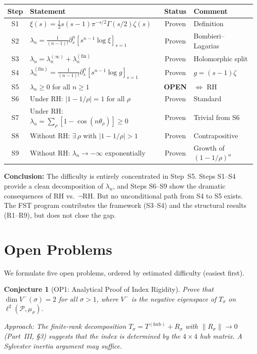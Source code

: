\documentclass[12pt,a4paper]{article}
\newtheorem{conjecture}[theorem]{Conjecture}
\theoremstyle{definition}
\theoremstyle{remark}
\newcommand{\muG}{\mu_\sigma}
\newcommand{\PP}{\mathcal{P}}
\begin{document}
\medskip
\begin{center}
\renewcommand{\arraystretch}{1.3}
\begin{tabular}{c|l|c|l}
\textbf{Step} & \textbf{Statement} & \textbf{Status} & \textbf{Comment} \\\hline
S1 & $\xi(s) = \frac{1}{2}s(s-1)\pi^{-s/2}\Gamma(s/2)\zeta(s)$ & Proven & Definition \\
S2 & $\lambda_n = \frac{1}{(n-1)!}\partial_s^n[s^{n-1}\log\xi]_{s=1}$ & Proven & Bombieri--Lagarias \\
S3 & $\lambda_n = \lambda_n^{(\infty)} + \lambda_n^{(\mathrm{fin})}$ & Proven & Holomorphic split \\
S4 & $\lambda_n^{(\mathrm{fin})} = \frac{1}{(n-1)!}\partial_s^n[s^{n-1}\log g]_{s=1}$ & Proven & $g=(s-1)\zeta$ \\
S5 & $\lambda_n \geq 0$ for all $n \geq 1$ & \textbf{OPEN} & $\Leftrightarrow$ RH \\
S6 & Under RH: $|1-1/\rho|=1$ for all $\rho$ & Proven & Standard \\
S7 & Under RH: $\lambda_n = \sum_\rho[1-\cos(n\theta_\rho)] \geq 0$ & Proven & Trivial from S6 \\
S8 & Without RH: $\exists\,\rho$ with $|1-1/\rho|>1$ & Proven & Contrapositive \\
S9 & Without RH: $\lambda_n \to -\infty$ exponentially & Proven & Growth of $(1-1/\rho)^n$ \\
\end{tabular}
\end{center}

\medskip\noindent
\textbf{Conclusion:} The difficulty is entirely concentrated in Step~S5. Steps S1--S4 provide a clean decomposition of $\lambda_n$, and Steps S6--S9 show the dramatic consequences of RH vs.\ $\neg$RH. But no unconditional path from S4 to S5 exists. The FST program contributes the framework (S3--S4) and the structural results (R1--R9), but does not close the gap.


\section{Open Problems}
\label{sec:open}

We formulate five open problems, ordered by estimated difficulty (easiest first).

\begin{conjecture}[OP1: Analytical Proof of Index Rigidity]
Prove that $\dim V^-(\sigma) = 2$ for all $\sigma > 1$, where $V^-$ is the negative eigenspace of $T_\sigma$ on $\ell^2(\PP, \muG)$.

\emph{Approach:} The finite-rank decomposition $T_\sigma = T^{(\mathrm{hub})} + R_\sigma$ with $\|R_\sigma\| \to 0$ (Part~III, \S3) suggests that the index is determined by the $4 \times 4$ hub matrix. A Sylvester inertia argument may suffice.
\end{conjecture}
\end{document}
